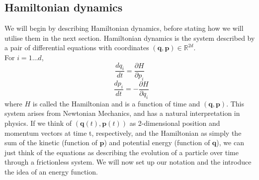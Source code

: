 \documentclass[11pt]{article}
\begin{document}
\subsection{Hamiltonian dynamics}
We will begin by describing Hamiltonian dynamics, before stating how we will utilise them in the next section. Hamiltonian dynamics is the system described by a pair of differential equations with coordinates $(\mathbf{q},\mathbf{p}) \in \mathbb{R}^{2d}$.\\ For $i=1 \dots d$,
\begin{equation}
\label{Ham1}
\frac{dq_{i}}{dt} = \frac{\partial H}{\partial p_{i}}
\end{equation}
\begin{equation}
\label{Ham2}
\ \ \frac{dp_{i}}{dt} = -\frac{\partial H}{\partial q_{i}}
\end{equation}
where $H$ is called the Hamiltonian and is a function of time and $(\mathbf{q},\mathbf{p})$. This system arises from Newtonian Mechanics, and has a natural interpretation in physics. If we think of $(\mathbf{q}(t),\mathbf{p}(t))$ as 2-dimensional position and momentum  vectors at time t, respectively, and the Hamiltonian as simply the sum of the kinetic (function of $\mathbf{p}$) and potential energy (function of $\mathbf{q}$), we can just think of the equations as describing the evolution of a particle over time through a frictionless system. We will now set up our notation and the introduce the idea of an energy function.
\end{document}
